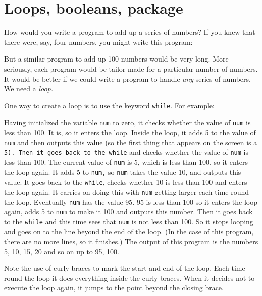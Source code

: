 \section{Loops, booleans, package}

How would you write a program to add up a series of numbers?
If you knew that there were, say, four numbers, you might write
this program:


But a similar program to add up 100 numbers would be very long.
More seriously, each program would be tailor-made for a particular
number of numbers.  It would be better if we could write a program
to handle \emph{any} series of numbers.  We need a \emph{loop.}

One way to create a loop is to use the keyword \texttt{while}.
For example:


Having initialized the variable  \texttt{num} to zero, it checks whether
the value of  \texttt{num} is less than 100.  It is, so it enters the loop.
Inside the loop, it adds 5 to the value
of \texttt{num} and then outputs this value (so the first thing that
appears on the screen is a \texttt{5).  Then it goes back to the while}
and checks whether the value of \texttt{num} is less than 100.  The current value of \texttt{num} is 5, which is less than
100, so it enters the loop again.  It adds 5 to \texttt{num,} so \texttt{num} takes
the value 10, and outputs this value.  It goes back to the \texttt{while},
checks whether 10 is less than 100 and enters the loop again.
It carries on doing this with \texttt{num} getting larger each time round the
loop.  Eventually  \texttt{num} has the value 95.  95 is less than 100 so
it enters the loop again, adds 5 to  \texttt{num} to make it 100 and outputs
this number.  Then it goes back to the \texttt{while} and this time sees that
 \texttt{num} is not less than 100.  So it stops looping and goes on to the line
beyond the end of the loop.  (In the case of this program, there are
no more lines, so it finishes.)
The output of this program is the numbers 5, 10, 15, 20 and so on up
to 95, 100.

Note the use of curly braces to mark the start and end of the loop.
Each time round the loop it does everything inside the curly braces.
When it decides not to execute the loop again, it jumps to the point
beyond the closing brace.


